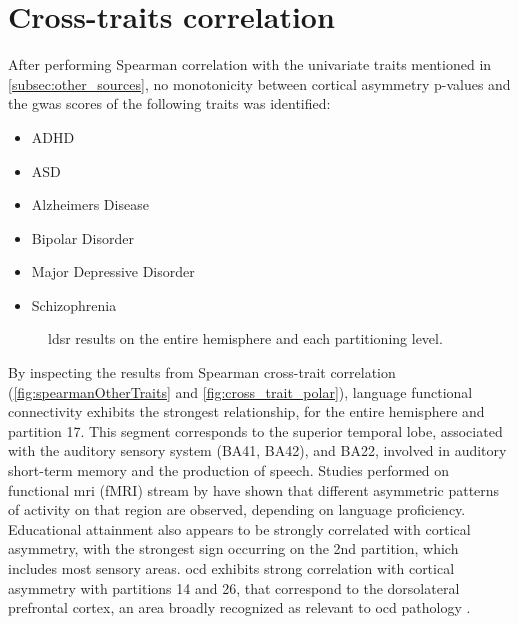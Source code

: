 \section{Cross-traits correlation}
After performing Spearman correlation with the univariate traits mentioned in \autoref{subsec:other_sources}, no monotonicity between cortical asymmetry p-values and the \ac{gwas} scores of the following traits was identified:
\begin{itemize}
	\item{ADHD}
	\item{ASD}
	\item{Alzheimers Disease}
	\item{Bipolar Disorder}
	\item{Major Depressive Disorder}
	\item{Schizophrenia}
\end{itemize}

\begin{figure}[H]
	\centering
	\quad
	\caption[LDSR results across partitioning levels]{\Ac{ldsr} results on the entire hemisphere and each partitioning level.}
	\label{fig:ldsr}
\end{figure}


By inspecting the results from Spearman cross-trait correlation (\autoref{fig:spearmanOtherTraits} and \ref{fig:cross_trait_polar}), language functional connectivity exhibits the strongest relationship, for the entire hemisphere and partition 17. This segment corresponds to the superior temporal lobe, associated with the auditory sensory system (BA41, BA42), and BA22, involved in auditory short-term memory and the production of speech. Studies performed on functional \ac{mri} (fMRI) stream by \citet{Hesling2012} have shown that different asymmetric patterns of activity on that region are observed, depending on language proficiency. Educational attainment also appears to be strongly correlated with cortical asymmetry, with the strongest sign occurring on the 2nd partition, which includes most sensory areas. \Ac{ocd} exhibits strong correlation with cortical asymmetry with partitions 14 and 26,  that correspond to the dorsolateral prefrontal cortex, an area broadly recognized as relevant to \ac{ocd} pathology \cite{Li2020,Han2016}. 

